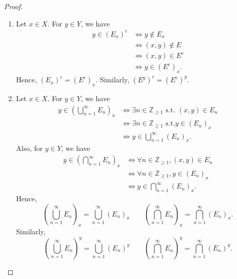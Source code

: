 \documentclass[a4paper, openany]{memoir}
\theoremstyle{definition}
\theoremstyle{plain}
\begin{document}
    \begin{proof}
        \hspace*{0pt}
        \begin{enumerate}
            \item Let $x \in X$. For $y \in Y$, we have
            \begin{align*}
                y \in (E_x)^c &\iff y \not\in E_x \\
                &\iff (x, y) \not\in E \\
                &\iff (x, y) \in E^c \\
                &\iff y \in (E^c)_x.
            \end{align*}
            Hence, $(E_x)^c = (E^c)_x$. Similarly, $(E^y)^c = (E^c)^y$.

            \item Let $x \in X$. For $y \in Y$, we have
            \begin{align*}
                y \in \left(\bigcup_{n=1}^\infty E_n\right)_x &\iff \exists n \in \mathbb{Z}_{\geq 1} \textrm{ s.t. } (x, y) \in E_n \\
                &\iff \exists n \in \mathbb{Z}_{\geq 1} \textrm{ s.t.} y \in (E_n)_x \\
                &\iff y \in \bigcup_{n=1}^\infty (E_n)_x.
            \end{align*}
            Also, for $y \in Y$, we have
            \begin{align*}
                y \in \left(\bigcap_{n=1}^\infty E_n\right)_x &\iff \forall n \in \mathbb{Z}_{\geq 1}, (x, y) \in E_n \\
                &\iff \forall n \in \mathbb{Z}_{\geq 1}, y \in (E_n)_x \\
                &\iff y \in \bigcap_{n=1}^\infty (E_n)_x.
            \end{align*}
            Hence,
            \[\left(\bigcup_{n=1}^\infty E_n \right)_x = \bigcup_{n=1}^\infty (E_n)_x \qquad \left(\bigcap_{n=1}^\infty E_n \right)_x = \bigcap_{n=1}^\infty (E_n)_x.\]
            Similarly,
            \[\left(\bigcup_{n=1}^\infty E_n \right)^y = \bigcup_{n=1}^\infty (E_n)^y \qquad
            \left(\bigcap_{n=1}^\infty E_n \right)^y = \bigcap_{n=1}^\infty (E_n)^y.\]
        \end{enumerate}
    \end{proof}
\end{document}
